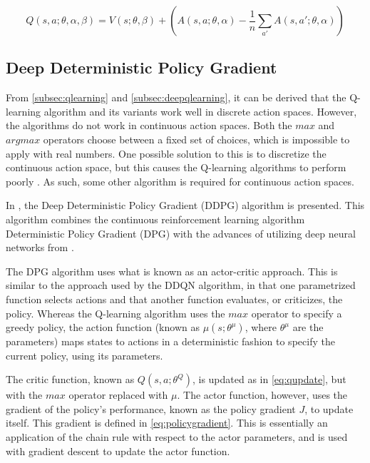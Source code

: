 \documentclass{kththesis}
\begin{document}
\begin{equation}
\label{eq:duelingcombine}
Q(s,a;\theta,\alpha,\beta) = V(s;\theta,\beta) + (A(s, a;\theta, \alpha) - \frac{1}{n}\sum_{a'}A(s, a';\theta, \alpha))
\end{equation}

\subsection{Deep Deterministic Policy Gradient}
From \autoref{subsec:qlearning} and \autoref{subsec:deepqlearning}, it can be derived that the Q-learning algorithm and its variants work well in discrete action spaces. However, the algorithms do not work in continuous action spaces. Both the $max$ and $argmax$ operators choose between a fixed set of choices, which is impossible to apply with real numbers. One possible solution to this is to discretize the continuous action space, but this causes the Q-learning algorithms to perform poorly \parencite{lillicrap2015continuous}. As such, some other algorithm is required for continuous action spaces.

In \textcite{lillicrap2015continuous}, the Deep Deterministic Policy Gradient (DDPG) algorithm is presented. This algorithm combines the continuous reinforcement learning algorithm Deterministic Policy Gradient (DPG) with the advances of utilizing deep neural networks from \textcite{mnih2015human}.

The DPG algorithm uses what is known as an actor-critic approach. This is similar to the approach used by the DDQN algorithm, in that one parametrized function selects actions and that another function evaluates, or criticizes, the policy. Whereas the Q-learning algorithm uses the $max$ operator to specify a greedy policy, the action function (known as $\mu(s;\theta^\mu)$, where $\theta^\mu$ are the parameters) maps states to actions in a deterministic fashion to specify the current policy, using its parameters. 

The critic function, known as $Q(s, a; \theta^Q)$, is updated as in \autoref{eq:qupdate}, but with the $max$ operator replaced with $\mu$. The actor function, however, uses the gradient of the policy's performance, known as the policy gradient $J$, to update itself. This gradient is defined in \autoref{eq:policygradient}. This is essentially an application of the chain rule with respect to the actor parameters, and is used with gradient descent to update the actor function. \parencite{lillicrap2015continuous}
\end{document}
